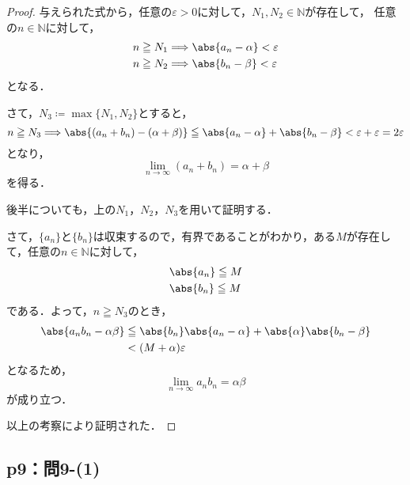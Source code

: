 \documentclass[uplatex,dvipdfmx,a4paper,10pt,fleqn]{jsarticle}
\begin{document}
    \begin{tleftbar}
        \begin{proof}
        与えられた式から，任意の$\varepsilon >0$に対して，$N_1 , N_2 \in \mathbb{N}$が存在して，
        任意の$n \in \mathbb{N}$に対して，
        \begin{align*} 
            & n \geqq N_1 \Longrightarrow \abs{a_n - \alpha}<\varepsilon \\
            & n \geqq N_2 \Longrightarrow \abs{b_n - \beta}<\varepsilon 
        \end{align*} 
        となる．

        さて，$N_3 \coloneqq \max \{ N_1 , N_2 \}$とすると，
        \[
           n \geqq N_3  \Longrightarrow \abs{(a_n+b_n)-(\alpha + \beta) } \leqq  \abs{a_n - \alpha}+\abs{b_n-\beta}<\varepsilon +\varepsilon=2\varepsilon 
         \]
         となり，
         \[
            \lim_{n \to \infty} (a_n + b_n)= \alpha + \beta
         \]
         を得る．

         後半についても，上の$N_1$，$N_2$，$N_3$を用いて証明する．

         さて，$\{ a_n \}$と$\{ b_n \}$は収束するので，有界であることがわかり，ある$M$が存在して，任意の$n \in \mathbb{N}$に対して，
         \begin{align*} 
            &\abs{a_n} \leqq M \\
            & \abs{b_n} \leqq M 
         \end{align*} 
         である．よって，$n \geqq N_3$のとき，
         \begin{align*} 
            \abs{a_n b_n - \alpha \beta} & \leqq \abs{b_n} \abs{a_n -\alpha } + \abs{\alpha} \abs{b_n -\beta} \\
            & < (M+\alpha )\varepsilon 
         \end{align*} 
         となるため，
         \[
            \lim_{n \to \infty} a_n b_n = \alpha \beta
         \]
         が成り立つ．

         以上の考察により証明された．
        \end{proof}
        \end{tleftbar}



    \subsection*{p9：問9-(1)}
\end{document}
